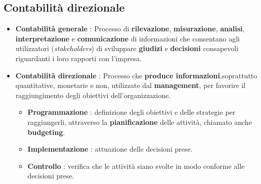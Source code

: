 \documentclass[a4paper,10pt]{article}
\begin{document}
\subsection{Contabilità direzionale}
\begin{itemize}
    \item \textbf{Contabilità generale} : Processo di \textbf{rilevazione}, \textbf{misurazione}, \textbf{analisi}, \textbf{interpretazione} e \textbf{comunicazione} di informazioni che consentano agli utilizzatori (\textit{stakeholders}) di sviluppare \textbf{giudizi} e \textbf{decisioni} consapevoli riguardanti i loro rapporti con l’impresa.
    \item \textbf{Contabilità direzionale} : Processo che \textbf{produce informazioni},soprattutto quantitative, monetarie e non, utilizzate dal \textbf{management}, per favorire il raggiungimento degli obiettivi dell'organizzazione.\begin{itemize}
              \item \textbf{Programmazione} : definizione degli obiettivi e delle strategie per raggiungerli, attraverso la \textbf{pianificazione} delle attività, chiamato anche \textbf{budgeting}.
              \item \textbf{Implementazione} : attuazione delle decisioni prese.
              \item \textbf{Controllo} : verifica che le attività siano svolte in modo conforme alle decisioni prese.
          \end{itemize}
\end{itemize}
\end{document}
